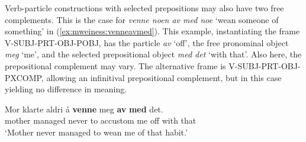 \documentclass[output=paper]{langsci/langscibook}
\begin{document}


Verb-particle constructions with selected prepositions may also have two free complements. 
This is the case for \emph{venne noen av med noe} `wean someone of something' in (\ref{ex:mweiness:venneavmed}).
This example, instantiating the frame V-SUBJ-PRT-OBJ-POBJ, has the particle \emph{av} `off', the free pronominal object \emph{meg} `me', and the selected prepositional object \emph{med det} `with that'.
Also here, the prepositional complement may vary.
The alternative frame is V-SUBJ-PRT-OBJ-PXCOMP, allowing an infinitival prepositional complement, but in this case yielding no difference in meaning.

\ea\label{ex:mweiness:venneavmed}
\gll   Mor klarte aldri å \textbf{venne} meg \textbf{av} \textbf{med} det. \\
         mother managed never to accustom me off with that \\
\glt `{Mother} never managed to wean me of that habit.' \\
\z

\end{document}
